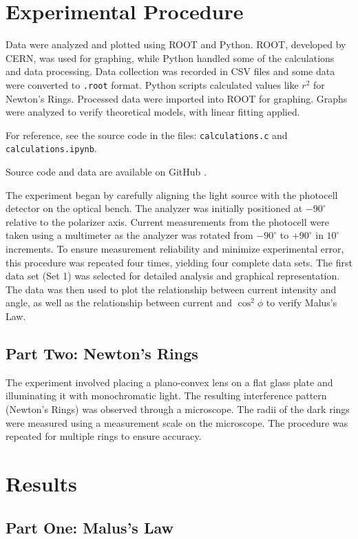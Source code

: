 \documentclass[journal]{IEEEtran}
\begin{document}
\section{Experimental Procedure}
Data were analyzed and plotted using ROOT and Python. ROOT, 
developed by CERN, was used for graphing, while Python handled some of 
the calculations and data processing. Data collection was recorded 
in CSV files and some data were converted to \texttt{.root} format. 
Python scripts calculated values like $r^2$ for Newton's Rings. Processed data were imported into ROOT for graphing. Graphs were analyzed to verify theoretical models, with linear fitting applied.

For reference, see the source code in the files: \texttt{calculations.c} and \texttt{calculations.ipynb}.

Source code and data are available on GitHub \cite{github}.

The experiment began by carefully aligning the light source with the photocell detector on the optical bench. The analyzer was initially positioned at $-90^{\circ}$ relative to the polarizer axis. Current measurements from the photocell were taken using a multimeter as the analyzer was rotated from $-90^{\circ}$ to $+90^{\circ}$ in $10^{\circ}$ increments. To ensure measurement reliability and minimize experimental error, this procedure was repeated four times, yielding four complete data sets. The first data set (Set 1) was selected for detailed analysis and graphical representation. The data was then used to plot the relationship between current intensity and angle, as well as the relationship between current and $\cos^2{\phi}$ to verify Malus's Law.

\subsection{Part Two: Newton's Rings}
The experiment involved placing a plano-convex lens on a flat glass plate and illuminating it with monochromatic light. The resulting interference pattern (Newton's Rings) was observed through a microscope. The radii of the dark rings were measured using a measurement scale on the microscope. The procedure was repeated for multiple rings to ensure accuracy.

\section{Results}

\subsection{Part One: Malus's Law}
\end{document}
